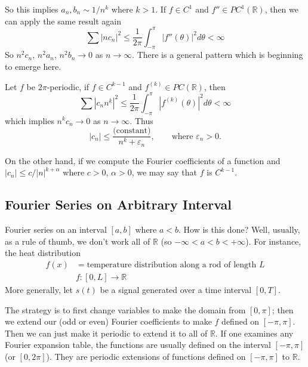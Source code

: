So this implies $a_n, b_n\sim 1/n^k$ where $k>1$. If $f\in
C^1$ and $f''\in PC^{1}(\mathbb{R})$, then we can apply the
same result again
\begin{equation}
\sum |nc_{n}|^{2}\leq
\frac{1}{2\pi}\int^{\pi}_{-\pi}|f''(\theta)|^{2}d\theta <
\infty
\end{equation}
So $n^2c_n$, $n^2a_n$, $n^2b_n\to 0$ as $n\to\infty$. There
is a general pattern which is beginning to emerge here.

\begin{thm}
Let $f$ be $2\pi$-periodic, if $f\in C^{k-1}$ and
$f^{(k)}\in PC(\mathbb{R})$, then
\begin{equation}
\sum|c_{n}n^k|^2\leq\frac{1}{2\pi}\int^{\pi}_{-\pi}|f^{(k)}(\theta)|^{2}d\theta<\infty
\end{equation}
which implies $n^kc_n\to 0$ as $n\to\infty$. Thus
\begin{equation}
|c_n|\leq\frac{\text{(constant)}}{n^k +
  \varepsilon_{n}},\qquad\text{where }\varepsilon_{n}>0.
\end{equation}
\end{thm}
On the other hand, if we compute the Fourier coefficients of
a function and $|c_n|\leq c/|n|^{k+\alpha}$ where $c>0$,
$\alpha>0$, we may say that $f$ is $C^{k-1}$.

\subsection{Fourier Series on Arbitrary Interval}

Fourier series on an interval $[a,b]$ where $a<b$. How is
this done? Well, usually, as a rule of thumb, we don't work
all of $\mathbb{R}$ (so $-\infty<a<b<+\infty$). For
instance, the heat distribution
\begin{eqnarray*}
f(x) &= \text{temperature distribution along a rod of length
  $L$} \\
&f:[0,L]\to\mathbb{R}
\end{eqnarray*}
More generally, let $s(t)$ be a signal generated over a time
interval $[0,T]$.

The strategy is to first change variables to make the domain
from $[0,\pi]$; then we extend our (odd or even) Fourier
coefficients to make $f$ defined on $[-\pi,\pi]$. Then we
can just make it periodic to extend it to all of
$\mathbb{R}$. If one examines any Fourier expansion table,
the functions are usually defined on the interval
$[-\pi,\pi]$ (or $[0,2\pi]$). They are periodic extensions
of functions defined on $[-\pi,\pi]$ to $\mathbb{R}$. 

